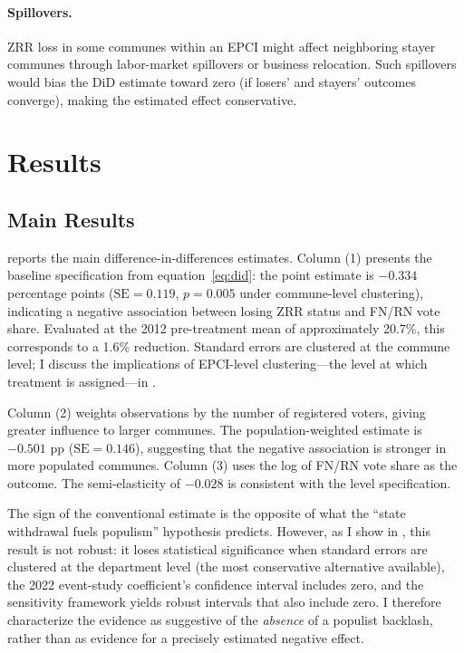 \documentclass[12pt]{article}
\begin{document}
\paragraph{Spillovers.} ZRR loss in some communes within an EPCI might affect neighboring stayer communes through labor-market spillovers or business relocation. Such spillovers would bias the DiD estimate toward zero (if losers' and stayers' outcomes converge), making the estimated effect conservative.


\section{Results} \label{sec:results}

\subsection{Main Results}

 reports the main difference-in-differences estimates. Column (1) presents the baseline specification from equation~\eqref{eq:did}: the point estimate is $-0.334$ percentage points ($\text{SE} = 0.119$, $p = 0.005$ under commune-level clustering), indicating a negative association between losing ZRR status and FN/RN vote share. Evaluated at the 2012 pre-treatment mean of approximately 20.7\%, this corresponds to a 1.6\% reduction. Standard errors are clustered at the commune level; I discuss the implications of EPCI-level clustering---the level at which treatment is assigned---in .

Column (2) weights observations by the number of registered voters, giving greater influence to larger communes. The population-weighted estimate is $-0.501$ pp ($\text{SE} = 0.146$), suggesting that the negative association is stronger in more populated communes. Column (3) uses the log of FN/RN vote share as the outcome. The semi-elasticity of $-0.028$ is consistent with the level specification.



The sign of the conventional estimate is the opposite of what the ``state withdrawal fuels populism'' hypothesis predicts. However, as I show in , this result is not robust: it loses statistical significance when standard errors are clustered at the department level (the most conservative alternative available), the 2022 event-study coefficient's confidence interval includes zero, and the \citet{rambachan2023more} sensitivity framework yields robust intervals that also include zero. I therefore characterize the evidence as suggestive of the \textit{absence} of a populist backlash, rather than as evidence for a precisely estimated negative effect.
\end{document}
